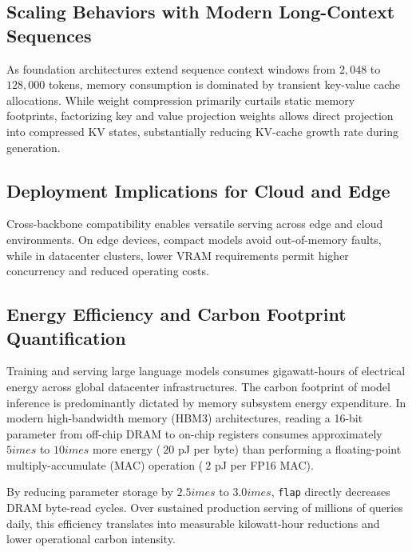 \subsection{Scaling Behaviors with Modern Long-Context Sequences}
As foundation architectures extend sequence context windows from $2{,}048$ to $128{,}000$ tokens, memory consumption is dominated by transient key-value cache allocations. While weight compression primarily curtails static memory footprints, factorizing key and value projection weights allows direct projection into compressed KV states, substantially reducing KV-cache growth rate during generation.

\subsection{Deployment Implications for Cloud and Edge}
Cross-backbone compatibility enables versatile serving across edge and cloud environments. On edge devices, compact models avoid out-of-memory faults, while in datacenter clusters, lower VRAM requirements permit higher concurrency and reduced operating costs.

\subsection{Energy Efficiency and Carbon Footprint Quantification}
Training and serving large language models consumes gigawatt-hours of electrical energy across global datacenter infrastructures. The carbon footprint of model inference is predominantly dictated by memory subsystem energy expenditure. In modern high-bandwidth memory (HBM3) architectures, reading a 16-bit parameter from off-chip DRAM to on-chip registers consumes approximately $5	imes$ to $10	imes$ more energy ($~20$ pJ per byte) than performing a floating-point multiply-accumulate (MAC) operation ($~2$ pJ per FP16 MAC).

By reducing parameter storage by $2.5	imes$ to $3.0	imes$, \texttt{flap} directly decreases DRAM byte-read cycles. Over sustained production serving of millions of queries daily, this efficiency translates into measurable kilowatt-hour reductions and lower operational carbon intensity.
